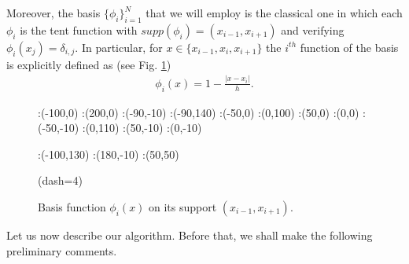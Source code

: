 Moreover, the basis $\big\{\phi_i\big\}_{i=1}^N$ that we will employ is the classical one in which each $\phi_i$ is the tent function with $supp(\phi_i)=(x_{i-1},x_{i+1})$ and verifying $\phi_i(x_j)=\delta_{i,j}$. In particular, for $x\in\{x_{i-1},x_i,x_{i+1}\}$ the $i^{th}$ function of the basis is explicitly defined as (see Fig. \ref{basis}) 
\begin{align}\label{basis_fun}
	\phi_i(x)= 1-\frac{|x-x_i|}{h}.
\end{align} 

\begin{figure}[h]
\figinit{0.7pt}
:(-100,0) :(200,0)
:(-90,-10) :(-90,140)
:(-50,0) :(0,100) 
:(50,0) :(0,0)
%
:(-50,-10) :(0,110) 
:(50,-10) :(0,-10)

:(-100,130) :(180,-10)
:(50,50)

\figdrawbegin{}
\figdrawarrow[1,2]
\figdrawline[3,4]
\figdrawline[4,5]
\figset(dash=4)
\figdrawline[4,6]
\figdrawarrow[11,12]

\figdrawend

\centerline{\box\figBoxA}
\caption{Basis function $\phi_i(x)$ on its support $(x_{i-1},x_{i+1})$.}\label{basis}
\end{figure}
\noindent Let us now describe our algorithm. Before that, we shall make the following preliminary comments.
